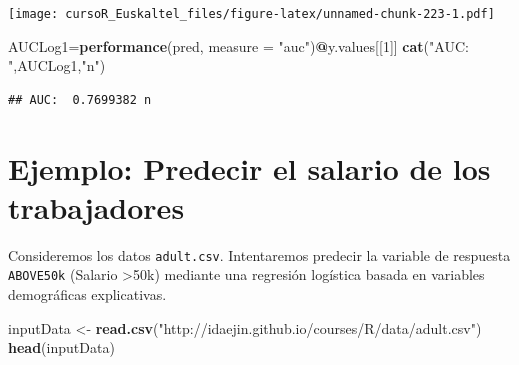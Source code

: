 \documentclass[]{book}
\newenvironment{Shaded}{\begin{snugshade}}{\end{snugshade}}
\newcommand{\KeywordTok}[1]{\textcolor[rgb]{0.13,0.29,0.53}{\textbf{#1}}}
\newcommand{\DataTypeTok}[1]{\textcolor[rgb]{0.13,0.29,0.53}{#1}}
\newcommand{\DecValTok}[1]{\textcolor[rgb]{0.00,0.00,0.81}{#1}}
\newcommand{\StringTok}[1]{\textcolor[rgb]{0.31,0.60,0.02}{#1}}
\newcommand{\OperatorTok}[1]{\textcolor[rgb]{0.81,0.36,0.00}{\textbf{#1}}}
\newcommand{\NormalTok}[1]{#1}
\begin{document}
\texttt{[image: cursoR\_Euskaltel\_files/figure-latex/unnamed-chunk-223-1.pdf]}

\begin{Shaded}
\begin{Highlighting}[]
\NormalTok{AUCLog1=}\KeywordTok{performance}\NormalTok{(pred, }\DataTypeTok{measure =} \StringTok{"auc"}\NormalTok{)}\OperatorTok{@}\NormalTok{y.values[[}\DecValTok{1}\NormalTok{]]}
\KeywordTok{cat}\NormalTok{(}\StringTok{"AUC: "}\NormalTok{,AUCLog1,}\StringTok{"n"}\NormalTok{)}
\end{Highlighting}
\end{Shaded}

\begin{verbatim}
## AUC:  0.7699382 n
\end{verbatim}

\section{Ejemplo: Predecir el salario de los
trabajadores}\label{ejemplo-predecir-el-salario-de-los-trabajadores}

Consideremos los datos \texttt{adult.csv}. Intentaremos predecir la
variable de respuesta \texttt{ABOVE50k} (Salario \textgreater{}50k)
mediante una regresión logística basada en variables demográficas
explicativas.

\begin{Shaded}
\begin{Highlighting}[]
\NormalTok{inputData <-}\StringTok{ }\KeywordTok{read.csv}\NormalTok{(}\StringTok{"http://idaejin.github.io/courses/R/data/adult.csv"}\NormalTok{)}
\KeywordTok{head}\NormalTok{(inputData)}
\end{Highlighting}
\end{Shaded}
\end{document}
